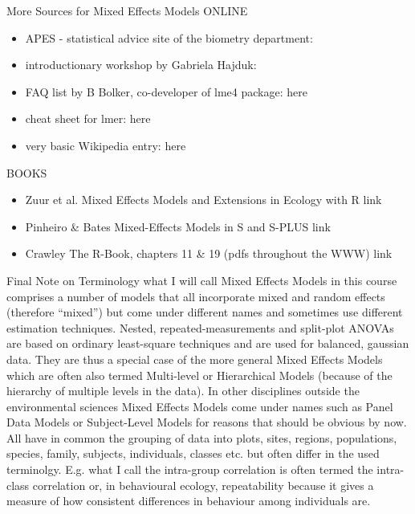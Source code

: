 \documentclass{beamer}
\begin{document}
\begin{frame}{More Sources for Mixed Effects Models}
ONLINE
  \begin{itemize}
    \item APES - statistical advice site of the biometry department: 
    \item introductionary workshop by Gabriela Hajduk:
    \item FAQ list by B Bolker, co-developer of lme4 package: here
    \item cheat sheet for lmer: here
    \item very basic Wikipedia entry: here
  \end{itemize}

BOOKS
  \begin{itemize}
    \item Zuur et al. Mixed Effects Models and Extensions in Ecology with R link
    \item Pinheiro \& Bates Mixed-Effects Models in S and S-PLUS link
    \item Crawley The R-Book, chapters 11 \& 19 (pdfs throughout the WWW) link
  \end{itemize}
  
\end{frame}

\begin{frame}{Final Note on Terminology}
  \footnotesize{
    what I will call Mixed Effects Models in this course comprises a number of models that all incorporate mixed and random effects (therefore “mixed”) but come under different names and sometimes use different estimation techniques. Nested, repeated-measurements and split-plot ANOVAs are based on ordinary least-square techniques and are used for balanced, gaussian data. They are thus a special case of the more general Mixed Effects Models which are often also termed Multi-level or Hierarchical Models (because of the hierarchy of multiple levels in the data). In other disciplines outside the environmental sciences Mixed Effects Models come under names such as Panel Data Models or Subject-Level Models for reasons that should be obvious by now. All have in common the grouping of data into plots, sites, regions, populations, species, family, subjects, individuals, classes etc. but often differ in the used terminolgy. E.g. what I call the intra-group correlation is often termed the intra-class correlation or, in behavioural ecology, repeatability because it gives a measure of how consistent differences in behaviour among individuals are. 
  }
\end{frame}
\end{document}
